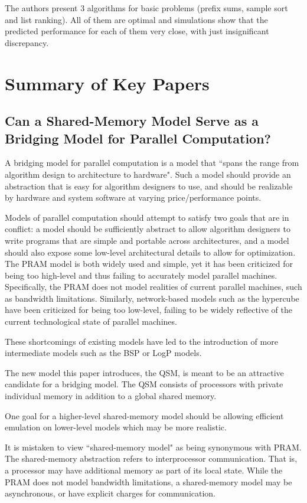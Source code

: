 \documentclass[12pt,a4paper]{article}
\begin{document}
The authors present 3 algorithms for basic problems (prefix sums, sample sort and list ranking). All of them are optimal and simulations show that the 
predicted performance for each of them very close, with just insignificant discrepancy.

\section{Summary of Key Papers}
\subsection{Can a Shared-Memory Model Serve as a Bridging Model for Parallel Computation?}
A bridging model for parallel computation is a model that ``spans the range from algorithm design to architecture to hardware". \cite{Gib99}
Such a model should provide an abstraction that is easy for algorithm designers to use, and should be realizable by hardware and system software at varying
price/performance points.

Models of parallel computation should attempt to satisfy two goals that are in conflict: a model should be sufficiently abstract to allow algorithm designers to
write programs that are simple and portable across architectures, and a model should also expose some low-level architectural details to allow for optimization. 
The PRAM model is both widely used and simple, yet it has been criticized for being too high-level and thus failing to accurately model parallel machines.
Specifically, the PRAM does not model realities of current parallel machines, such as bandwidth limitations. Similarly, network-based models such as the
hypercube have been criticized for being too low-level, failing to be widely reflective of the current technological state of parallel machines. 

These shortcomings of existing models have led to the introduction of more intermediate models such as the BSP or LogP models.

The new model this paper introduces, the QSM, is meant to be an attractive candidate for a bridging model. The QSM consists of processors with private
individual memory in addition to a global shared memory.

One goal for a 
higher-level shared-memory model should be allowing efficient emulation on lower-level models which may be more realistic. 

It is mistaken to view ``shared-memory model" as being synonymous with PRAM. The shared-memory abstraction refers to interprocessor communication. That is, a
processor may have additional memory as part of its local state. While the PRAM does not model bandwidth limitations, a shared-memory model may be
asynchronous, or have explicit charges for communication. 
\end{document}
